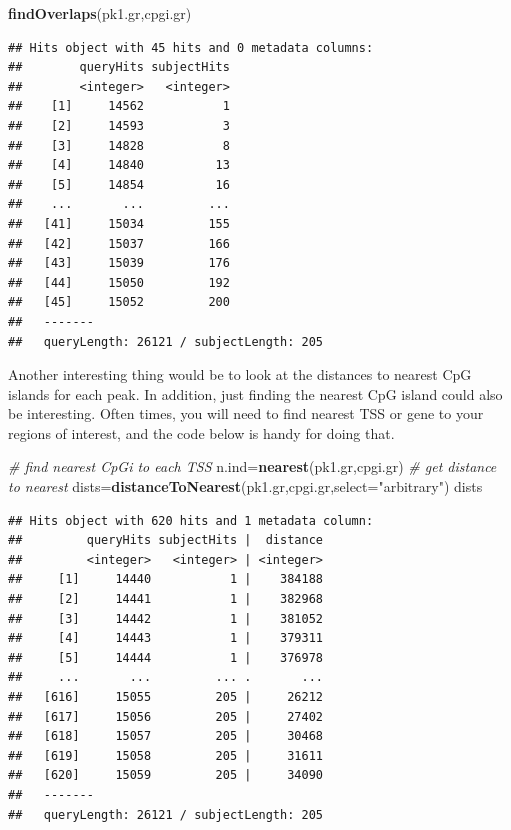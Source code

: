 \documentclass[12pt,]{krantz}
\newenvironment{Shaded}{\begin{snugshade}}{\end{snugshade}}
\newcommand{\CommentTok}[1]{\textcolor[rgb]{0.56,0.35,0.01}{\textit{#1}}}
\newcommand{\DataTypeTok}[1]{\textcolor[rgb]{0.13,0.29,0.53}{#1}}
\newcommand{\KeywordTok}[1]{\textcolor[rgb]{0.13,0.29,0.53}{\textbf{#1}}}
\newcommand{\NormalTok}[1]{#1}
\newcommand{\StringTok}[1]{\textcolor[rgb]{0.31,0.60,0.02}{#1}}
\begin{document}
\begin{Shaded}
\begin{Highlighting}[]
\KeywordTok{findOverlaps}\NormalTok{(pk1.gr,cpgi.gr)}
\end{Highlighting}
\end{Shaded}

\begin{verbatim}
## Hits object with 45 hits and 0 metadata columns:
##        queryHits subjectHits
##        <integer>   <integer>
##    [1]     14562           1
##    [2]     14593           3
##    [3]     14828           8
##    [4]     14840          13
##    [5]     14854          16
##    ...       ...         ...
##   [41]     15034         155
##   [42]     15037         166
##   [43]     15039         176
##   [44]     15050         192
##   [45]     15052         200
##   -------
##   queryLength: 26121 / subjectLength: 205
\end{verbatim}

Another interesting thing would be to look at the distances to nearest CpG islands for each peak. In addition, just finding the nearest CpG island could also be interesting. Often times, you will need to find nearest TSS or gene to your regions of interest, and the code below is handy for doing that.

\begin{Shaded}
\begin{Highlighting}[]
\CommentTok{# find nearest CpGi to each TSS}
\NormalTok{n.ind=}\KeywordTok{nearest}\NormalTok{(pk1.gr,cpgi.gr)}
\CommentTok{# get distance to nearest}
\NormalTok{dists=}\KeywordTok{distanceToNearest}\NormalTok{(pk1.gr,cpgi.gr,}\DataTypeTok{select=}\StringTok{"arbitrary"}\NormalTok{)}
\NormalTok{dists}
\end{Highlighting}
\end{Shaded}

\begin{verbatim}
## Hits object with 620 hits and 1 metadata column:
##         queryHits subjectHits |  distance
##         <integer>   <integer> | <integer>
##     [1]     14440           1 |    384188
##     [2]     14441           1 |    382968
##     [3]     14442           1 |    381052
##     [4]     14443           1 |    379311
##     [5]     14444           1 |    376978
##     ...       ...         ... .       ...
##   [616]     15055         205 |     26212
##   [617]     15056         205 |     27402
##   [618]     15057         205 |     30468
##   [619]     15058         205 |     31611
##   [620]     15059         205 |     34090
##   -------
##   queryLength: 26121 / subjectLength: 205
\end{verbatim}
\end{document}
